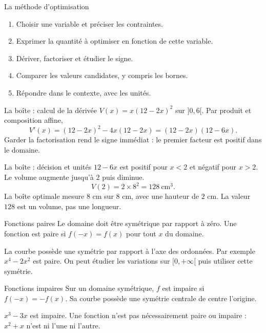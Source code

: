 \documentclass[aspectratio=169,12pt]{beamer}
\begin{document}
\renewcommand{\slidekind}{MÉTHODE \& EXEMPLE}
\begin{frame}[t,fragile]{La méthode d’optimisation}
\begin{enumerate}\item Choisir une variable et préciser les contraintes.\item Exprimer la quantité à optimiser en fonction de cette variable.\item Dériver, factoriser et étudier le signe.\item Comparer les valeurs candidates, y compris les bornes.\item Répondre dans le contexte, avec les unités.\end{enumerate}
\end{frame}
\renewcommand{\slidekind}{MÉTHODE \& EXEMPLE}
\begin{frame}[t,fragile]{La boîte : calcul de la dérivée}
$V(x)=x(12-2x)^2$ sur $]0,6[$. Par produit et composition affine,\[V\prime(x)=(12-2x)^2-4x(12-2x)=(12-2x)(12-6x).\] Garder la factorisation rend le signe immédiat : le premier facteur est positif dans le domaine.
\end{frame}
\renewcommand{\slidekind}{COMPRENDRE}
\begin{frame}[t,fragile]{La boîte : décision et unités}
$12-6x$ est positif pour $x<2$ et négatif pour $x>2$. Le volume augmente jusqu’à $2$ puis diminue.\[V(2)=2\times8^2=128\ \text{cm}^3.\] La boîte optimale mesure $8$ cm sur $8$ cm, avec une hauteur de $2$ cm. La valeur $128$ est un volume, pas une longueur.
\end{frame}
\renewcommand{\slidekind}{COMPRENDRE}
\begin{frame}[t,fragile]{Fonctions paires}
Le domaine doit être symétrique par rapport à zéro. Une fonction est paire si $f(-x)=f(x)$ pour tout $x$ du domaine.\medskip\par La courbe possède une symétrie par rapport à l’axe des ordonnées. Par exemple $x^4-2x^2$ est paire. On peut étudier les variations sur $[0,+\infty[$ puis utiliser cette symétrie.
\end{frame}
\renewcommand{\slidekind}{COMPRENDRE}
\begin{frame}[t,fragile]{Fonctions impaires}
Sur un domaine symétrique, $f$ est impaire si $f(-x)=-f(x)$. Sa courbe possède une symétrie centrale de centre l’origine.\medskip\par $x^3-3x$ est impaire. Une fonction n’est pas nécessairement paire ou impaire : $x^2+x$ n’est ni l’une ni l’autre.
\end{frame}
\end{document}
